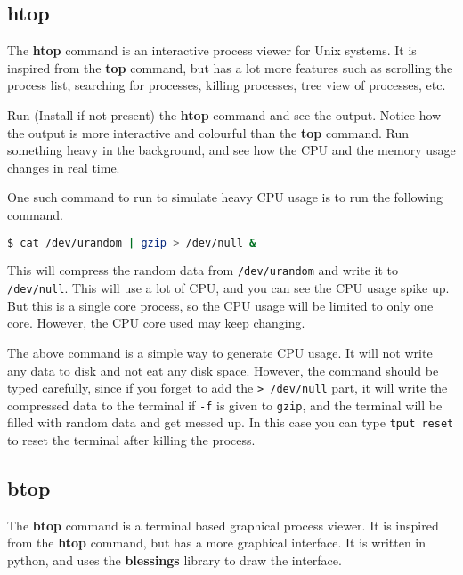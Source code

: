 \subsection{htop}

The \textbf{htop} command is an interactive process viewer for Unix systems.
It is inspired from the \textbf{top} command, but has a lot more features
such as scrolling the process list, searching for processes, killing processes,
tree view of processes, etc.

\begin{exercise}
  Run (Install if not present) the \textbf{htop} command and see the output.
  Notice how the output is more interactive and colourful than the \textbf{top}
  command. Run something heavy in the background, and see how the CPU and
  the memory usage changes in real time.
\end{exercise}

One such command to run to simulate heavy CPU usage is to run the following command.

\begin{lstlisting}[language=bash]
$ cat /dev/urandom | gzip > /dev/null &
\end{lstlisting}

This will compress the random data from \lstinline|/dev/urandom| and write it to
\lstinline|/dev/null|. This will use a lot of CPU, and you can see the CPU usage
spike up. But this is a single core process, so the CPU usage will be limited
to only one core. However, the CPU core used may keep changing.

\begin{remark}
  The above command is a simple way to generate CPU usage. It will not
  write any data to disk and not eat any disk space. However, the
  command should be typed carefully, since if you forget to add the
  \lstinline|> /dev/null| part, it will write the compressed data to the
  terminal if \lstinline|-f| is given to \lstinline|gzip|, and the terminal
  will be filled with random data and get messed up. In this case
  you can type \lstinline|tput reset| to reset the terminal after killing
  the process.
\end{remark}

\subsection{btop}

The \textbf{btop} command is a terminal based graphical process viewer.
It is inspired from the \textbf{htop} command, but has a more graphical
interface. It is written in python, and uses the \textbf{blessings} library
to draw the interface.

